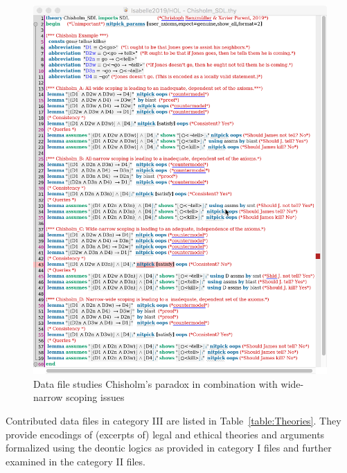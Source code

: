 \documentclass{article}
\begin{document}
\begin{figure}[ht!]
 \includegraphics[width=\textwidth]{Chisholm_SDL.png}
\caption{Data file \textsf{\small {}
    studies 
    Chisholm's paradox in combination with 
    wide-narrow scoping issues \label{fig:Chisholm_SDL}}}
\end{figure}

Contributed data files in category III are listed in
Table~\ref{table:Theories}. They provide encodings of (excerpts of)
legal and ethical theories and arguments formalized using the deontic logics as
provided in category I files and further examined in the category II
files.
\end{document}
